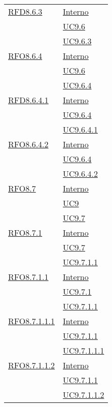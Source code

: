 \begin{longtable}{|>{\centering}m{5cm}|m{5cm}<{\centering}|}
\hyperlink{RFD8.6.3}{RFD8.6.3} & \hyperlink{Interno}{Interno}\\
& \hyperref[UC9.6]{UC9.6}\\
& \hyperref[UC9.6.3]{UC9.6.3}\\ \hline

\hyperlink{RFO8.6.4}{RFO8.6.4} & \hyperlink{Interno}{Interno}\\
& \hyperref[UC9.6]{UC9.6}\\
& \hyperref[UC9.6.4]{UC9.6.4}\\ \hline

\hyperlink{RFD8.6.4.1}{RFD8.6.4.1} & \hyperlink{Interno}{Interno}\\
& \hyperref[UC9.6.4]{UC9.6.4}\\
& \hyperref[UC9.6.4.1]{UC9.6.4.1}\\ \hline

\hyperlink{RFO8.6.4.2}{RFO8.6.4.2} & \hyperlink{Interno}{Interno}\\
& \hyperref[UC9.6.4]{UC9.6.4}\\
& \hyperref[UC9.6.4.2]{UC9.6.4.2}\\ \hline

\hyperlink{RFO8.7}{RFO8.7} & \hyperlink{Interno}{Interno}\\
& \hyperref[UC9]{UC9}\\
& \hyperref[UC9.7]{UC9.7}\\ \hline

\hyperlink{RFO8.7.1}{RFO8.7.1} & \hyperlink{Interno}{Interno}\\
& \hyperref[UC9.7]{UC9.7}\\
& \hyperref[UC9.7.1.1]{UC9.7.1.1}\\ \hline

\hyperlink{RFO8.7.1.1}{RFO8.7.1.1} & \hyperlink{Interno}{Interno}\\
& \hyperref[UC9.7.1]{UC9.7.1}\\
& \hyperref[UC9.7.1.1]{UC9.7.1.1}\\ \hline

\hyperlink{RFO8.7.1.1.1}{RFO8.7.1.1.1} & \hyperlink{Interno}{Interno}\\
& \hyperref[UC9.7.1.1]{UC9.7.1.1}\\
& \hyperref[UC9.7.1.1.1]{UC9.7.1.1.1}\\ \hline

\hyperlink{RFO8.7.1.1.2}{RFO8.7.1.1.2} & \hyperlink{Interno}{Interno}\\
& \hyperref[UC9.7.1.1]{UC9.7.1.1}\\
& \hyperref[UC9.7.1.1.2]{UC9.7.1.1.2}\\ \hline


\end{longtable}
